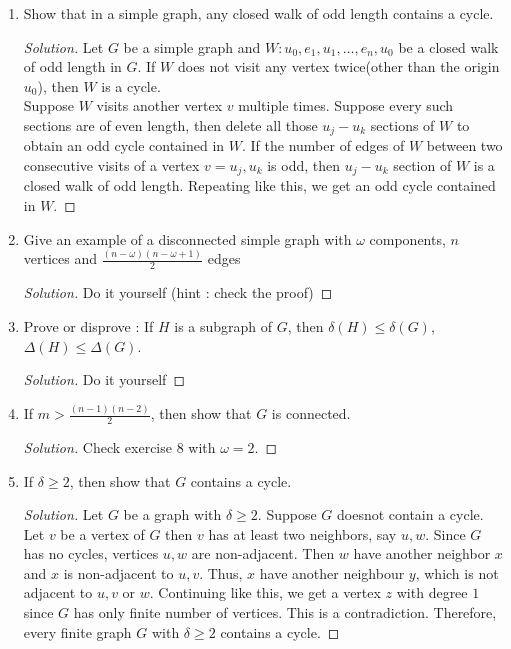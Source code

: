 \begin{enumerate}
\begin{proof}[Solution]
		Let $X,Y$ be the partite sets of $G$ with cardinality $p,q$.
		Then the degree sum of vertices in $X$ is $kp$ and the degree sum of vertices in $Y$ is $kq$.
		We know that $G$ is bipartite, thus every edge in $G$ has one end in $X$ and the other end in $Y$.
		Thus, the degree sum of $X$ and $Y$ should be the same.
		That is, $kp = kq$.
		Therefore $p = q$.
		In other word, both partite sets have the same number of vertices.
	\end{proof}
	\item Show that in a simple graph, any closed walk of odd length contains a cycle.
	\begin{proof}[Solution]
		Let $G$ be a simple graph and $W : u_0,e_1,u_1,\dots,e_n,u_0$ be a closed walk of odd length in $G$. If $W$ does not visit any vertex twice(other than the origin $u_0$), then $W$ is a cycle.\\

		Suppose $W$ visits another vertex $v$ multiple times. Suppose every such sections are of even length, then delete all those $u_j-u_k$ sections of $W$ to obtain an odd cycle contained in $W$. If the number of edges of $W$ between two consecutive visits of a vertex $v = u_j,u_k$ is odd, then $u_j-u_k$ section of $W$ is a closed walk of odd length. Repeating like this, we get an odd cycle contained in $W$.
	\end{proof}
\item Give an example of a disconnected simple graph with $\omega$ components, $n$ vertices and $\frac{(n-\omega)(n-\omega+1)}{2}$ edges
	\begin{proof}[Solution]
		Do it yourself (hint : check the proof)
	\end{proof}
\item Prove or disprove : If $H$ is a subgraph of $G$, then $\delta(H) \le \delta(G)$, $\Delta(H) \le \Delta(G)$.
	\begin{proof}[Solution]
		Do it yourself
	\end{proof}
\item If $m > \frac{(n-1)(n-2)}{2}$, then show that $G$ is connected.
	\begin{proof}[Solution]
		Check exercise $8$ with $\omega = 2$.
	\end{proof}
	\item If $\delta \ge 2$, then show that $G$ contains a cycle.
	\begin{proof}[Solution]
		Let $G$ be a graph with $\delta \ge 2$.
		Suppose $G$ doesnot contain a cycle.
		Let $v$ be a vertex of $G$ then $v$ has at least two neighbors, say $u,w$. Since $G$ has no cycles, vertices $u,w$ are non-adjacent. Then $w$ have another neighbor  $x$ and $x$ is non-adjacent to $u,v$. Thus, $x$ have another neighbour $y$, which is not adjacent to $u,v$ or $w$. Continuing like this, we get a vertex $z$ with degree $1$ since $G$ has only finite number of vertices. This is a contradiction. Therefore, every finite graph $G$ with $\delta \ge 2$ contains a cycle.
	\end{proof}
\end{enumerate}

